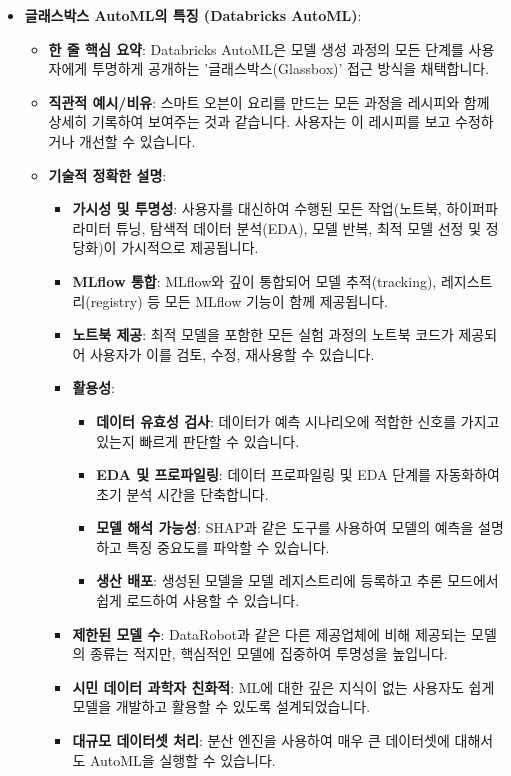 \documentclass[11pt,a4paper]{article}
\begin{document}
\begin{itemize}
    \item \textbf{글래스박스 AutoML의 특징 (Databricks AutoML)}:
    \begin{itemize}
        \item \textbf{한 줄 핵심 요약}: Databricks AutoML은 모델 생성 과정의 모든 단계를 사용자에게 투명하게 공개하는 '글래스박스(Glassbox)' 접근 방식을 채택합니다.
        \item \textbf{직관적 예시/비유}: 스마트 오븐이 요리를 만드는 모든 과정을 레시피와 함께 상세히 기록하여 보여주는 것과 같습니다. 사용자는 이 레시피를 보고 수정하거나 개선할 수 있습니다.
        \item \textbf{기술적 정확한 설명}:
        \begin{itemize}
            \item \textbf{가시성 및 투명성}: 사용자를 대신하여 수행된 모든 작업(노트북, 하이퍼파라미터 튜닝, 탐색적 데이터 분석(EDA), 모델 반복, 최적 모델 선정 및 정당화)이 가시적으로 제공됩니다.
            \item \textbf{MLflow 통합}: MLflow와 깊이 통합되어 모델 추적(tracking), 레지스트리(registry) 등 모든 MLflow 기능이 함께 제공됩니다.
            \item \textbf{노트북 제공}: 최적 모델을 포함한 모든 실험 과정의 노트북 코드가 제공되어 사용자가 이를 검토, 수정, 재사용할 수 있습니다.
            \item \textbf{활용성}:
            \begin{itemize}
                \item \textbf{데이터 유효성 검사}: 데이터가 예측 시나리오에 적합한 신호를 가지고 있는지 빠르게 판단할 수 있습니다.
                \item \textbf{EDA 및 프로파일링}: 데이터 프로파일링 및 EDA 단계를 자동화하여 초기 분석 시간을 단축합니다.
                \item \textbf{모델 해석 가능성}: SHAP과 같은 도구를 사용하여 모델의 예측을 설명하고 특징 중요도를 파악할 수 있습니다.
                \item \textbf{생산 배포}: 생성된 모델을 모델 레지스트리에 등록하고 추론 모드에서 쉽게 로드하여 사용할 수 있습니다.
            \end{itemize}
            \item \textbf{제한된 모델 수}: DataRobot과 같은 다른 제공업체에 비해 제공되는 모델의 종류는 적지만, 핵심적인 모델에 집중하여 투명성을 높입니다.
            \item \textbf{시민 데이터 과학자 친화적}: ML에 대한 깊은 지식이 없는 사용자도 쉽게 모델을 개발하고 활용할 수 있도록 설계되었습니다.
            \item \textbf{대규모 데이터셋 처리}: 분산 엔진을 사용하여 매우 큰 데이터셋에 대해서도 AutoML을 실행할 수 있습니다.
        \end{itemize}
    \end{itemize}


\end{itemize}
\end{document}
